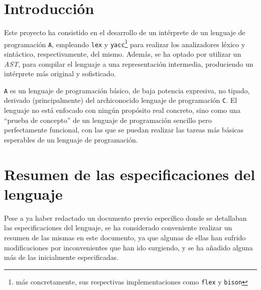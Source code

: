 \documentclass[12pt]{article}
\begin{document}

\tableofcontents
\pagebreak


\section{Introducción}
Este proyecto ha consistido en el desarrollo de un intérprete de un lenguaje de programación \texttt{A}, empleando \texttt{lex} y \texttt{yacc}\footnote{más concretamente, sus respectivas implementaciones como \texttt{flex} y \texttt{bison}} para realizar los analizadores léxico y sintáctico, respectivamente, del mismo. Además, se ha optado por utilizar un \textit{AST}, para compilar el lenguaje a una representación intermedia, produciendo un intérprete más original y sofisticado.\par
\texttt{A} es un lenguaje de programación básico, de baja potencia expresiva, no tipado, derivado (principalmente) del archiconocido lenguaje de programación \texttt{C}. El lenguaje no está enfocado con ningún propósito real concreto, sino como una ``prueba de concepto'' de un lenguaje de programación sencillo pero perfectamente funcional, con las que se puedan realizar las tareas más básicas esperables de un lenguaje de programación.

\section{Resumen de las especificaciones del lenguaje}
Pese a ya haber redactado un documento previo específico donde se detallaban las especificaciones del lenguaje, se ha considerado conveniente realizar un resumen de las mismas en este documento, ya que algunas de ellas han sufrido modificaciones por inconvenientes que han ido surgiendo, y se ha añadido alguna más de las inicialmente especificadas.
\end{document}
